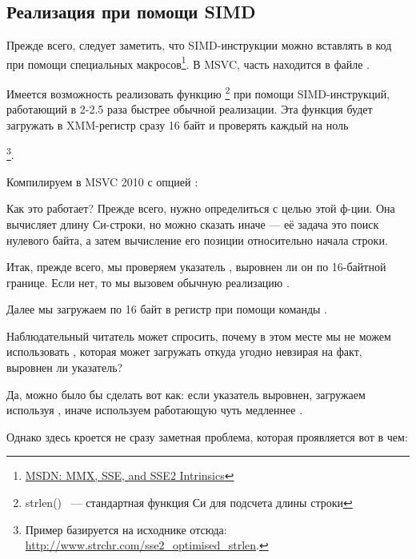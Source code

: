 ﻿\subsection{Реализация \strlen при помощи SIMD}
\label{SIMD_strlen}

\newcommand{\URLMSDNSSE}{\href{http://msdn.microsoft.com/en-us/library/y0dh78ez(VS.80).aspx}{MSDN: MMX, SSE, and SSE2 Intrinsics}}

Прежде всего, следует заметить, что SIMD-инструкции можно вставлять в \CCpp код при помощи специальных 
макросов\footnote{\URLMSDNSSE}. В MSVC, часть находится в файле .

\newcommand{\URLSTRLEN}{http://www.strchr.com/sse2_optimised_strlen}

Имеется возможность реализовать функцию \strlen\footnote{strlen() ~--- стандартная функция Си 
для подсчета длины строки} при помощи SIMD-инструкций, работающий в 2-2.5 раза быстрее обычной реализации. 
Эта функция будет загружать в XMM-регистр сразу 16 байт и проверять каждый на ноль

\footnote{Пример базируется на исходнике отсюда: \url{\URLSTRLEN}.}.



Компилируем в MSVC 2010 с опцией \Ox:



Как это работает?
Прежде всего, нужно определиться с целью этой ф-ции.
Она вычисляет длину Си-строки, но можно сказать иначе --- её задача это поиск нулевого байта, а затем вычисление его позиции относительно начала строки.

Итак, прежде всего, мы проверяем указатель , выровнен ли он по 16-байтной границе. 
Если нет, то мы вызовем обычную реализацию \strlen.

Далее мы загружаем по 16 байт в регистр  при помощи команды \MOVDQA.

Наблюдательный читатель может спросить, почему в этом месте мы не можем использовать \MOVDQU, 
которая может загружать откуда угодно невзирая на факт, выровнен ли указатель?

Да, можно было бы сделать вот как: если указатель выровнен, загружаем используя \MOVDQA, 
иначе используем работающую чуть медленнее \MOVDQU.

Однако здесь кроется не сразу заметная проблема, которая проявляется вот в чем:

